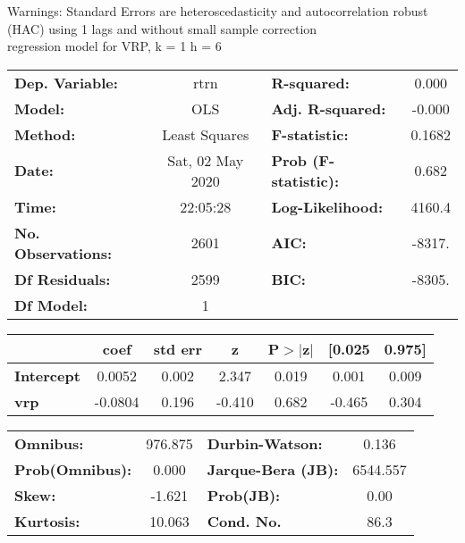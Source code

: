 Warnings: \newline
 [1] Standard Errors are heteroscedasticity and autocorrelation robust (HAC) using 1 lags and without small sample correction\\ 

regression model for VRP, k = 1 h = 6\begin{center}
\begin{tabular}{lclc}
\toprule
\textbf{Dep. Variable:}    &       rtrn       & \textbf{  R-squared:         } &     0.000   \\
\textbf{Model:}            &       OLS        & \textbf{  Adj. R-squared:    } &    -0.000   \\
\textbf{Method:}           &  Least Squares   & \textbf{  F-statistic:       } &    0.1682   \\
\textbf{Date:}             & Sat, 02 May 2020 & \textbf{  Prob (F-statistic):} &    0.682    \\
\textbf{Time:}             &     22:05:28     & \textbf{  Log-Likelihood:    } &    4160.4   \\
\textbf{No. Observations:} &        2601      & \textbf{  AIC:               } &    -8317.   \\
\textbf{Df Residuals:}     &        2599      & \textbf{  BIC:               } &    -8305.   \\
\textbf{Df Model:}         &           1      & \textbf{                     } &             \\
\bottomrule
\end{tabular}
\begin{tabular}{lcccccc}
                   & \textbf{coef} & \textbf{std err} & \textbf{z} & \textbf{P$> |$z$|$} & \textbf{[0.025} & \textbf{0.975]}  \\
\midrule
\textbf{Intercept} &       0.0052  &        0.002     &     2.347  &         0.019        &        0.001    &        0.009     \\
\textbf{vrp}       &      -0.0804  &        0.196     &    -0.410  &         0.682        &       -0.465    &        0.304     \\
\bottomrule
\end{tabular}
\begin{tabular}{lclc}
\textbf{Omnibus:}       & 976.875 & \textbf{  Durbin-Watson:     } &    0.136  \\
\textbf{Prob(Omnibus):} &   0.000 & \textbf{  Jarque-Bera (JB):  } & 6544.557  \\
\textbf{Skew:}          &  -1.621 & \textbf{  Prob(JB):          } &     0.00  \\
\textbf{Kurtosis:}      &  10.063 & \textbf{  Cond. No.          } &     86.3  \\
\bottomrule
\end{tabular}
\end{center}

